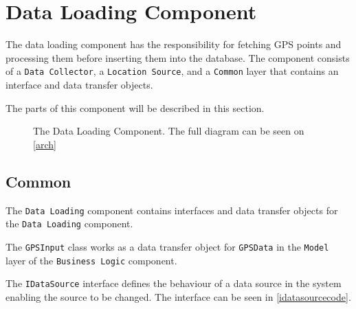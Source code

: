 \section{Data Loading Component}
The data loading component has the responsibility for fetching GPS points and processing them before inserting them into the database.
The component consists of a \texttt{Data Collector}, a \texttt{Location Source}, and a \texttt{Common} layer that contains an interface and data transfer objects.

The parts of this component will be described in this section.
\begin{figure}[h]
\centering
{}
\caption{The Data Loading Component. The full diagram can be seen on \cref{arch}}
\label{dataloadingcomponent}
\end{figure}

\subsection{Common}
The \texttt{Data Loading} component contains interfaces and data transfer objects for the \texttt{Data Loading} component.

The \lstinline!GPSInput! class works as a data transfer object for \lstinline!GPSData! in the \texttt{Model} layer of the \texttt{Business Logic} component.

The \lstinline!IDataSource! interface defines the behaviour of a data source in the system enabling the source to be changed.
The interface can be seen in \cref{idatasourcecode}.

